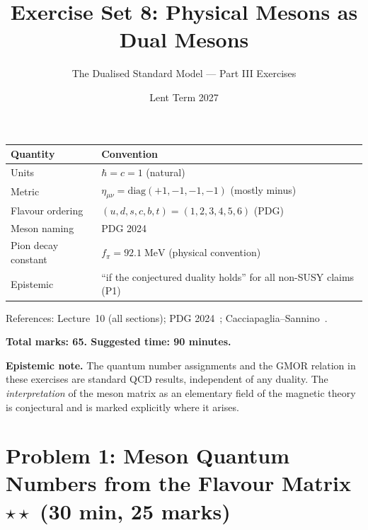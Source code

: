 \documentclass[11pt,a4paper]{article}
\title{\textbf{Exercise Set 8: Physical Mesons as Dual Mesons}}
\author{The Dualised Standard Model --- Part III Exercises}
\date{Lent Term 2027}
\newcommand{\fpi}{f_\pi}
\begin{document}
\maketitle

\begin{conventionbox}[title={Conventions for these exercises}]
\renewcommand{\arraystretch}{1.3}
\begin{tabular}{@{}l l@{}}
\toprule
\textbf{Quantity} & \textbf{Convention} \\
\midrule
Units & $\hbar = c = 1$ (natural) \\
Metric & $\eta_{\mu\nu} = \mathrm{diag}(+1,-1,-1,-1)$ (mostly minus) \\
Flavour ordering & $(u, d, s, c, b, t) = (1, 2, 3, 4, 5, 6)$ (PDG) \\
Meson naming & PDG 2024~\cite{PDG2024} \\
Pion decay constant & $\fpi = 92.1\;\text{MeV}$ (physical convention) \\
Epistemic & ``if the conjectured duality holds'' for all non-SUSY claims (P1) \\
\bottomrule
\end{tabular}

\medskip

\noindent References: Lecture~10 (all sections);
PDG 2024~\cite{PDG2024}; Cacciapaglia--Sannino~\cite{CacciapagliaSannino2024}.

\medskip

\noindent\textbf{Total marks: 65. \quad Suggested time: 90 minutes.}

\medskip

\noindent\textbf{Epistemic note.}
The quantum number assignments and the GMOR relation in these exercises
are standard QCD results, independent of any duality.  The
\emph{interpretation} of the meson matrix as an elementary field of the
magnetic theory is conjectural and is marked explicitly where it arises.
\end{conventionbox}

\bigskip


\section*{Problem 1: Meson Quantum Numbers from the Flavour Matrix
  \hfill $\star\star$ \normalsize(30 min, 25 marks)}
\label{prob:meson-qn}
\end{document}
